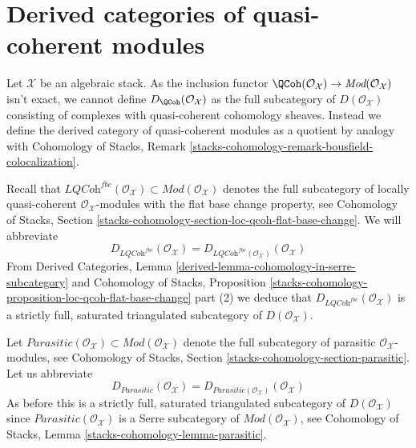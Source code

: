 \section{Derived categories of quasi-coherent modules}
\label{section-derived}

\noindent
Let $\mathcal{X}$ be an algebraic stack. As the inclusion functor
$\QCoh(\mathcal{O}_\mathcal{X}) \to
\textit{Mod}(\mathcal{O}_\mathcal{X})$ isn't exact, we cannot define
$D_\QCoh(\mathcal{O}_\mathcal{X})$ as the full subcategory
of $D(\mathcal{O}_\mathcal{X})$ consisting of complexes with quasi-coherent
cohomology sheaves. Instead we define the derived category of
quasi-coherent modules as a quotient
by analogy with Cohomology of Stacks, Remark
\ref{stacks-cohomology-remark-bousfield-colocalization}.

\medskip\noindent
Recall that $\textit{LQCoh}^{fbc}(\mathcal{O}_\mathcal{X}) \subset
\textit{Mod}(\mathcal{O}_\mathcal{X})$ denotes the full subcategory
of locally quasi-coherent $\mathcal{O}_\mathcal{X}$-modules with the
flat base change property, see Cohomology of Stacks, Section
\ref{stacks-cohomology-section-loc-qcoh-flat-base-change}.
We will abbreviate
$$
D_{\textit{LQCoh}^{fbc}}(\mathcal{O}_\mathcal{X}) =
D_{\textit{LQCoh}^{fbc}(\mathcal{O}_\mathcal{X})}(\mathcal{O}_\mathcal{X})
$$
From
Derived Categories, Lemma \ref{derived-lemma-cohomology-in-serre-subcategory}
and Cohomology of Stacks, Proposition
\ref{stacks-cohomology-proposition-loc-qcoh-flat-base-change} part (2)
we deduce that $D_{\textit{LQCoh}^{fbc}}(\mathcal{O}_\mathcal{X})$
is a strictly full, saturated triangulated subcategory of
$D(\mathcal{O}_\mathcal{X})$.

\medskip\noindent
Let $\textit{Parasitic}(\mathcal{O}_\mathcal{X}) \subset
\textit{Mod}(\mathcal{O}_\mathcal{X})$ denote the full subcategory
of parasitic $\mathcal{O}_\mathcal{X}$-modules, see
Cohomology of Stacks, Section
\ref{stacks-cohomology-section-parasitic}.
Let us abbreviate
$$
D_{\textit{Parasitic}}(\mathcal{O}_\mathcal{X}) =
D_{\textit{Parasitic}(\mathcal{O}_\mathcal{X})}(\mathcal{O}_\mathcal{X})
$$
As before this is a strictly full, saturated triangulated subcategory of
$D(\mathcal{O}_\mathcal{X})$ since
$\textit{Parasitic}(\mathcal{O}_\mathcal{X})$
is a Serre subcategory of $\textit{Mod}(\mathcal{O}_\mathcal{X})$, see
Cohomology of Stacks, Lemma \ref{stacks-cohomology-lemma-parasitic}.


